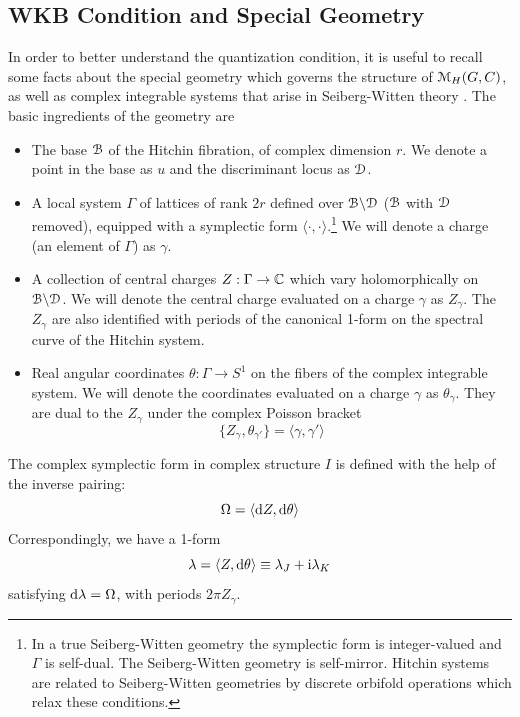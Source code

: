 \documentclass[11pt,a4paper]{article}
\begin{document}
\subsection{WKB Condition and Special Geometry}
In order to better understand the quantization condition, it is useful to recall some facts about the special geometry which 
governs the structure of ${\mathcal M}_H(G,C)$, as well as complex integrable systems that arise in Seiberg-Witten theory \cite{Seiberg:1994rs,GKMMM,DoW,Freed:1997dp, Gaiotto:2008cd}.
The basic ingredients of the geometry are 
\begin{itemize}
\item The base ${{\mathcal B}}$ of the Hitchin fibration, of complex dimension $r$. We denote a point in the base as $u$ and the discriminant locus as ${\cal D}$.
\item A local system $\Gamma$ of lattices of rank $2r$ defined over ${\cal B}\backslash {\cal D}$ ($\cal B$ with $\cal D$ removed), equipped with a symplectic form $\langle\cdot,\cdot \rangle$.\footnote{In a true Seiberg-Witten geometry the symplectic form is integer-valued and $\Gamma$ is self-dual. The Seiberg-Witten geometry is self-mirror. Hitchin systems are related to Seiberg-Witten geometries by discrete orbifold operations which relax these conditions.} We will denote a charge (an
element of $\Gamma$) as $\gamma$. 
\item A collection of central charges $Z: \Gamma \to {\mathbb C}$ which vary holomorphically on ${\cal B}\backslash{\cal D}$. We will denote the central charge evaluated on a charge $\gamma$ as $Z_\gamma$. The $Z_\gamma$ are also identified with periods of the canonical 1-form on the spectral curve of the Hitchin system. 
\item Real angular coordinates $\theta: \Gamma \to S^1$ on the fibers of the complex integrable system. We will denote the coordinates evaluated on a charge $\gamma$ as $\theta_\gamma$. They are dual to the $Z_\gamma$ under the complex Poisson bracket 
\begin{equation}
\{Z_\gamma, \theta_{\gamma'} \} = \langle \gamma, \gamma' \rangle
\end{equation}
\end{itemize}

The complex symplectic form in complex structure $I$ is defined with the help of the inverse pairing:
\begin{equation}
\Omega = \langle \mathrm d Z, \mathrm d\theta \rangle
\end{equation}
Correspondingly, we have a 1-form 
\begin{equation}
\lambda  = \langle Z, \mathrm d\theta \rangle\equiv \lambda_J + {\mathrm i} \lambda_K
\end{equation}
satisfying $\mathrm d\lambda=\Omega$, with periods $2 \pi Z_\gamma$. 
\end{document}
